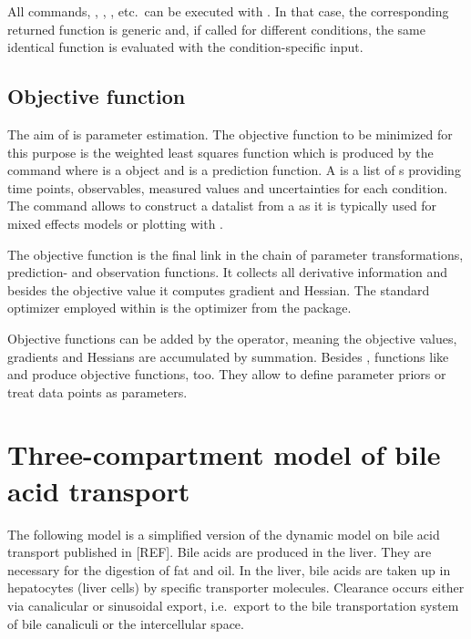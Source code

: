 \documentclass[article]{jss}
\begin{document}
All commands, , , , etc.~can be executed with . In that case, the corresponding returned function is generic and, if called for different conditions, the same identical function is evaluated with the condition-specific input. 

\subsection{Objective function}

The aim of  is parameter estimation. The objective function to be minimized for this purpose is the weighted least squares function which is produced by the command  where  is a  object and  is a prediction function. A  is a list of s providing time points, observables, measured values and uncertainties for each condition. The  command allows to construct a datalist from a  as it is typically used for mixed effects models or plotting with . 

The objective function is the final link in the chain of parameter transformations, prediction- and observation functions. It collects all derivative information and besides the objective value it computes gradient and Hessian. The standard optimizer employed within  is the  optimizer from the  package.

Objective functions can be added by the  operator, meaning the objective values, gradients and Hessians are accumulated by summation. Besides , functions like  and  produce objective functions, too. They allow to define parameter priors or treat data points as parameters.


\section{Three-compartment model of bile acid transport}
\label{sec:example}

The following model is a simplified version of the dynamic model on bile acid transport published in [REF]. Bile acids are produced in the liver. They are necessary for the digestion of fat and oil. In the liver, bile acids are taken up in hepatocytes (liver cells) by specific transporter molecules. Clearance occurs either via canalicular or sinusoidal export, i.e.~export to the bile transportation system of bile canaliculi or the intercellular space.
\end{document}

